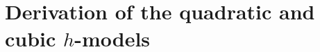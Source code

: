 \documentclass[11pt]{article}
\theoremstyle{plain}
\theoremstyle{definition}
\theoremstyle{definition}
\def\p{\text{\bf\emph{p}}}
\def\p{{\partial\hspace{1pt}}}
\begin{document}


\section{Derivation of the quadratic and cubic $h$-models}\label{sec:hmodels}
\end{document}
